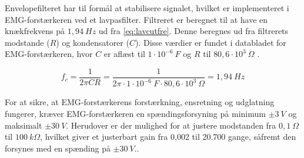 Envelopefilteret har til formål at stabilisere signalet, hvilket er implementeret i EMG-forstærkeren ved et lavpasfilter. Filtreret er beregnet til at have en knækfrekvens på $1,94~Hz$ ud fra \autoref{eq:lavcutfre}. Denne  beregnes ud fra filtrerets modstande ($R$) og kondensatorer ($C$). Disse værdier er fundet i databladet for EMG-forstærkeren, hvor $C$ er aflæst til $1 \cdot 10^{-6}~F$ og $R$ til $80,6 \cdot 10^3~\Omega$ \citep{advancertech2013}. 

\begin{equation}\label{eq:lavcutfre}
f_c = \frac{1}{2 \pi C R} = \frac{1}{2 \pi \cdot 1 \cdot 10^{-6}~F \cdot 80,6 \cdot 10^3~\Omega} = 1,94~Hz
\end{equation}

\noindent
For at sikre, at EMG-forstærkerens forstærkning, ensretning og udglatning fungerer, kræver EMG-forstærkeren en spændingsforsyning på minimum $\pm 3~V$ og maksimalt $\pm 30~V$. Herudover er der mulighed for at justere modstanden fra $0,1~\Omega$ til $100~k\Omega$, hvilket giver et justerbart gain fra 0,002 til 20.700 gange, såfremt den forsynes med en spænding på $\pm 30~V$.\citep{advancertech2013}. 